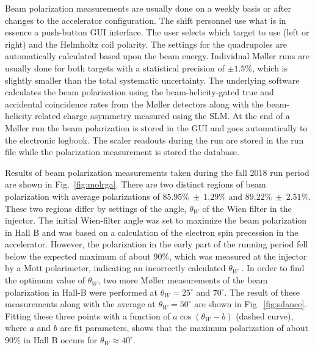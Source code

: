 Beam polarization measurements are usually done on a weekly basis or after changes to the accelerator configuration.  The shift personnel
use what is in essence a push-button GUI interface. The user selects which target to use (left or right) and the
Helmholtz coil polarity. The settings for the quadrupoles are automatically calculated based upon the beam energy. Individual M{\o}ller runs
are usually done for both targets with a statistical precision of $\pm 1.5$\%, which is slightly smaller than the total systematic uncertainty. 
The underlying software calculates the beam polarization using the beam-helicity-gated true and accidental coincidence rates from 
the M{\o}ller detectors along with the beam-helicity related charge asymmetry measured using the SLM. 
At the end of a M{\o}ller run the beam polarization is stored in the GUI and goes automatically to the electronic logbook. The scaler 
readouts during the run are stored in the run file while the polarization measurement is stored the database. 


Results of beam polarization measurements taken during the fall 2018 run period are shown in Fig.~\ref{fig:molrga}.
There are two distinct regions of beam polarization with average polarizations of $85.95\% ~\pm ~1.29\%$ and $89.22\%~\pm~2.51\%$. 
These two regions differ by settings of the angle, $\theta_W$ of the Wien filter in the injector. The initial Wien-filter angle was 
set to maximize the beam polarization in Hall B and was based on a calculation of the electron spin precession in the accelerator. 
However, the polarization in the early part of the running period fell below the expected maximum of about 90\%, which was measured 
at the injector by a Mott polarimeter, indicating an incorrectly calculated $\theta_W$ . In order to find the optimum value of $\theta_W$, 
two more M{\o}ller measurements of the beam polarization in Hall-B were performed at $\theta_W=25^\circ$ and $70^\circ$.  
The result of these measurements along with the average at $\theta_W=50^\circ$ are shown in Fig.~\ref{fig:sdance}. Fitting these three 
points with a function of $a\cos\left(\theta_W-b\right)$ (dashed curve), where $a$ and $b$ are fit parameters,  shows that the maximum
polarization of about 90\% in Hall B occurs for $\theta_W\approx 40^\circ$.
 
